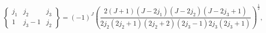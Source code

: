 \[\begin{Bmatrix}j_{1}&j_{2}&j_{3}\\
1&j_{3}-1&j_{2}\end{Bmatrix}=(-1)^{J}\left(\frac{2(J+1)(J-2j_{1})(J-2j_{2})(J-%
2j_{3}+1)}{2j_{2}(2j_{2}+1)(2j_{2}+2)(2j_{3}-1)2j_{3}(2j_{3}+1)}\right)^{\frac%
{1}{2}},\]